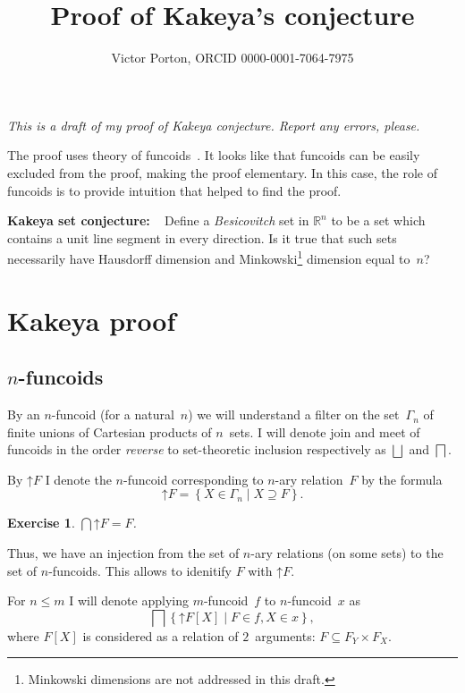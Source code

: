\documentclass[oneside,draft]{amsart}
\title{Proof of Kakeya's conjecture}
\author{Victor Porton, ORCID 0000-0001-7064-7975}
\newcommand{\setcond}[2]{\left\{#1\mid#2\right\}}
\newtheorem{exer}{Exercise}
\begin{document}
\maketitle  

\emph{This is a draft of my proof of Kakeya conjecture. Report any errors, please.}

The proof uses theory of funcoids~\cite{volume-1}. It looks like that funcoids can be easily excluded from the proof, making the proof elementary. In this case, the role of funcoids is to provide intuition that helped to find the proof.

\textbf{Kakeya set conjecture:} \cite{kakeya-long}~\cite{tao-blog-kakeya} Define a \emph{Besicovitch} set in $\mathbb{R}^n$ to be a set which contains a unit line segment in every direction. Is it true that such sets necessarily have Hausdorff dimension and Minkowski\footnote{Minkowski dimensions are not addressed in this draft.} dimension equal to~$n$?

\section{Kakeya proof}

\subsection{$n$-fun\-co\-ids}

By an $n$-fun\-co\-id (for a natural~$n$) we will understand a filter on the set~$\Gamma_n$ of finite unions of Cartesian products of $n$~sets. I will denote join and meet of funcoids in the order \emph{reverse} to set-the\-o\-re\-tic inclusion respectively as $\bigsqcup$ and $\bigsqcap$.

By $\mathord{\uparrow}F$ I denote the $n$-fun\-co\-id corresponding to $n$-ary relation~$F$ by the formula
\[ \mathord{\uparrow}F = \setcond{X\in\Gamma_n}{X\supseteq F}. \]

\begin{exer}
$\bigcap\mathord{\uparrow}F = F$.
\end{exer}

Thus, we have an injection from the set of $n$-ary relations (on some sets) to the set of $n$-fun\-co\-ids.
This allows to idenitify $F$ with $\mathord{\uparrow}F$.

For $n\leq m$ I will denote applying $m$-fun\-co\-id~$f$ to $n$-fun\-co\-id~$x$ as
\[ \bigsqcap\setcond{\mathord{\uparrow} F[X]}{F\in f,X\in x}, \]
where $F[X]$ is considered as a relation of $2$~arguments: $F\subseteq F_Y\times F_X$.
\end{document}
